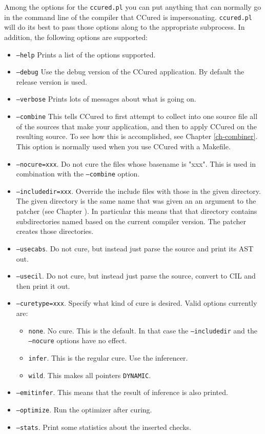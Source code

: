\documentclass{book}
\def\t#1{{\tt #1}}
\def\DYNAMIC{\t{DYNAMIC}}
\begin{document}
 Among the options for the \t{ccured.pl} you can put anything that can
normally go in the command line of the compiler that CCured is impersonating.
\t{ccured.pl} will do its best to pass those options along to the appropriate
subprocess. In addition, the following options are supported:

\begin{itemize}
\item \t{--help} Prints a list of the options supported.
\item \t{--debug} Use the debug version of the CCured application. By default
the release version is used.
\item \t{--verbose} Prints lots of messages about what is going on.
\item \t{--combine} This tells CCured to first attempt to collect into one
source file all of the sources that make your application, and then to apply
CCured on the resulting source. To see how this is accomplished, see Chapter
\ref{ch-combiner}. This option is normally used when you use CCured with a
Makefile. 
\item \t{--nocure=xxx}. Do not cure the files whose basename is "xxx". This is
used in combination with the \t{--combine} option.
\item \t{--includedir=xxx}. Override the include files with those in the given
directory. The given directory is the same name that was given an an argument
to the patcher (see Chapter \label{ch-patcher}). In particular this means that
that directory contains subdirectories named based on the current compiler
version. The patcher creates those directories. 
\item \t{--usecabs}. Do not cure, but instead just parse the source and print
its AST out. 
\item \t{--usecil}. Do not cure, but instead just parse the source, convert to
CIL and then print it out. 
\item \t{--curetype=xxx}. Specify what kind of cure is desired. Valid options
currently are:
   \begin{itemize}
    \item \t{none}. No cure. This is the default. In that case the
           \t{--includedir} and the \t{--nocure} options have no effect. 
    \item \t{infer}. This is the regular cure. Use the inferencer.
    \item \t{wild}. This makes all pointers \DYNAMIC{}.
   \end{itemize}
\item \t{--emitinfer}. This means that the result of inference is also
printed. 
\item \t{--optimize}. Run the optimizer after curing.
\item \t{--stats}. Print some statistics about the inserted checks.
\end{itemize}
\end{document}
